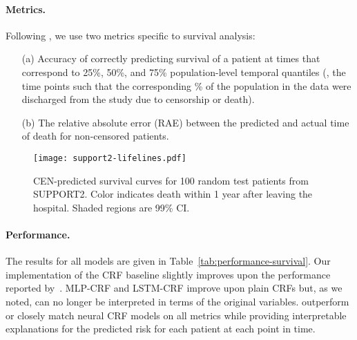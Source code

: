 \documentclass[twoside,11pt]{article}
\begin{document}
\paragraph{Metrics.}
Following \citet{lin2011learning}, we use two metrics specific to survival analysis:
\begin{itemize}[noitemsep,topsep=2pt,parsep=2pt,leftmargin=2em]
    \item[(a)] Accuracy of correctly predicting survival of a patient at times that correspond to 25\%, 50\%, and 75\% population-level temporal quantiles (\ie, the time points such that the corresponding \% of the population in the data were discharged from the study due to censorship or death).
    \item[(b)] The relative absolute error (RAE) between the predicted and actual time of death for non-censored patients.
\end{itemize}


\begin{wrapfigure}[14]{l}{0.37\textwidth}
\centering
\vspace{-2.5ex}
\texttt{[image: support2-lifelines.pdf]}\caption{CEN-predicted survival curves for 100 random test patients from SUPPORT2.
Color indicates death within 1 year after leaving the hospital.
Shaded regions are 99\% CI.}
\label{fig:support2-lifelines}
\end{wrapfigure}
 
\paragraph{Performance.}
The results for all models are given in Table~\ref{tab:performance-survival}.
Our implementation of the CRF baseline slightly improves upon the performance reported by~\citet{lin2011learning}.
MLP-CRF and LSTM-CRF improve upon plain CRFs but, as we noted, can no longer be interpreted in terms of the original variables.
{\CENs} outperform or closely match neural CRF models on all metrics while providing interpretable explanations for the predicted risk for each patient at each point in time.
\end{document}
